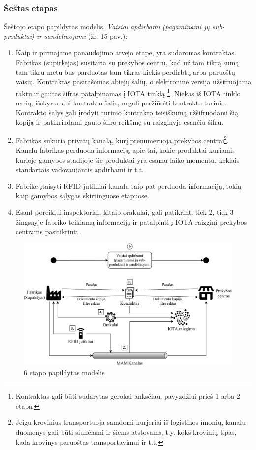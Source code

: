 \subsubsection{Šeštas etapas}

Šeštojo etapo papildytas modelis, \textit{Vaisiai apdirbami (pagaminami jų sub-produktai) ir sandėliuojami} (žr. 15 pav.):
\begin{enumerate}
    \item Kaip ir pirmajame panaudojimo atvejo etape, yra sudaromas kontraktas. Fabrikas (supirkėjas) susitaria su prekybos centru, kad už tam tikrą sumą tam tikru metu bus parduotas tam tikras kiekis perdirbtų arba paruoštų vaisių. Kontraktas pasirašomas abiejų šalių, o elektroninė versija užšifruojama raktu ir gautas šifras patalpinamas į IOTA tinklą \footnote{Kontraktas gali būti sudarytas gerokai anksčiau, pavyzdžiui prieš 1 arba 2 etapą.}. Niekas iš IOTA tinklo narių, išskyrus abi kontrakto šalis, negali peržiūrėti kontrakto turinio. Kontrakto šalys gali įrodyti turimo kontrakto teisiškumą užšifruodami šią kopiją ir patikrindami gauto šifro reikšmę su raizginyje esančiu šifru.
    \item Fabrikas sukuria privatų kanalą, kurį prenumeruoja prekybos centrai\footnote{Jeigu krovinius transportuoja samdomi kurjeriai iš logistikos įmonių, kanalu duomenys gali būti siunčiami ir šiems atstovams, t.y. koks krovinių tipas, kada krovinys paruoštas transportavimui ir t.t.}. Kanalu fabrikas perduoda informaciją apie tai, kokie produktai kuriami, kurioje gamybos stadijoje šie produktai yra esamu laiko momentu, kokiais standartais vadovaujantis apdirbami ir t.t.
    \item Fabrike įtaisyti RFID jutikliai kanalu taip pat perduoda informaciją, tokią kaip gamybos sąlygas skirtinguose etapuose.
    \item Esant poreikiui inspektoriai, kitaip orakulai, gali patikrinti tiek 2, tiek 3 žingsnyje fabriko teikiamą informaciją ir patalpinti į IOTA raizginį prekybos centrams pasitikrinti.
\end{enumerate}

\begin{figure}[H]
    \centering
    \includegraphics[scale=0.7]{images/iota-usecase-6}
    \caption{6 etapo papildytas modelis}
\end{figure}



